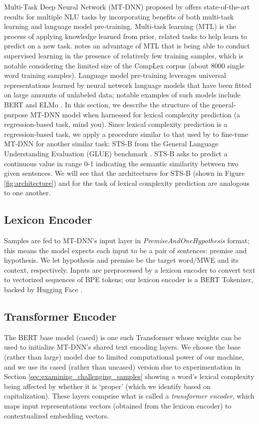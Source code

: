 \documentclass{dcthesis}
\theoremstyle{definition}
\theoremstyle{remark}
\begin{document}
Multi-Task Deep Neural Network (MT-DNN) proposed by \citet{liu2019multi} offers state-of-the-art results for multiple NLU tasks by incorporating benefits of both multi-task learning and language model pre-training. Multi-task learning (MTL) is the process of applying knowledge learned from prior, related tasks to help learn to predict on a new task. \citet{liu2019multi} notes an advantage of MTL that is being able to conduct supervised learning in the presence of relatively few training samples, which is notable considering the limited size of the CompLex corpus (about 8000 single word training samples). Language model pre-training leverages universal representations learned by neural network language models that have been fitted on large amounts of unlabeled data; notable examples of such models include BERT \citep{devlin2018bert} and ELMo \citep{peters2018deep}. In this section, we describe the structure of the general-purpose MT-DNN model when harnessed for lexical complexity prediction (a regression-based task, mind you). Since lexical complexity prediction is a regression-based task, we apply a procedure similar to that used by \citet{liu2019multi} to fine-tune MT-DNN for another similar task: STS-B from the General Language Understanding Evaluation (GLUE) benchmark \citep{wang2018glue}. STS-B asks to predict a continuous value in range 0-1 indicating the semantic similarity between two given sentences. We will see that the architectures for STS-B (shown in Figure \ref{fig:architecture}) and for the task of lexical complexity prediction are analogous to one another.

\subsection{Lexicon Encoder}

Samples are fed to MT-DNN's input layer in \textit{PremiseAndOneHypothesis} format; this means the model expects each input to be a pair of sentences: premise and hypothesis. We let hypothesis and premise be the target word/MWE and its context, respectively. Inputs are preprocessed by a lexicon encoder to convert text to vectorized sequences of BPE tokens; our lexicon encoder is a BERT Tokenizer, backed by Hugging Face \citep{wolf2020transformers}.

\subsection{Transformer Encoder}

The BERT base model (cased) is one such Transformer whose weights can be used to initialize MT-DNN's shared text encoding layers. We choose the base (rather than large) model due to limited computational power of our machine, and we use its cased (rather than uncased) version due to experimentation in Section \ref{sec:examining_challenging_samples} showing a word's lexical complexity being affected by whether it is `proper' (which we identify based on capitalization). These layers comprise what is called a \textit{transformer encoder}, which maps input representations vectors (obtained from the lexicon encoder) to contextualized embedding vectors.
\end{document}
